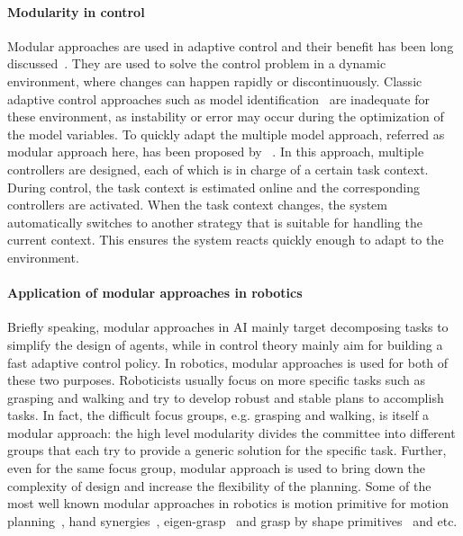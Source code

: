\paragraph{Modularity in control}
Modular approaches are used in adaptive control and their benefit has been long discussed~\citep{jacobs1991adaptive,narendra1997adaptive}. They are used to solve the control problem in a dynamic environment, where changes can happen rapidly or discontinuously.
Classic adaptive control approaches such as model identification~\citep{khalil2004modeling} are inadequate for these environment, as instability or error may occur during the optimization of the model variables. To quickly adapt the multiple model approach, referred as modular approach here, has been proposed by ~\citet{narendra1995adaptation}. In this approach, multiple controllers are designed, each of which is in charge of a certain task context. During control, the task context is estimated online and the corresponding controllers are activated. When the task context changes, the system automatically switches to another strategy that is suitable for handling the current context. This ensures the system reacts quickly enough to adapt to the environment.

\paragraph{Application of modular approaches in robotics}
Briefly speaking, modular approaches in AI mainly target decomposing tasks to simplify the design of agents, while in control theory mainly aim for building a fast adaptive control policy. In robotics, modular approaches is used for both of these two purposes. Roboticists usually focus on more specific tasks such as grasping and walking and try to develop robust and stable plans to accomplish tasks. In fact, the difficult focus groups, e.g. grasping and walking, is itself a modular approach: the high level modularity divides the committee into different groups that each try to provide a generic solution for the specific task. Further, even for the same focus group, modular approach is used to bring down the complexity of design and increase the flexibility of the planning. Some of the most well known modular approaches in robotics is motion primitive for motion planning~\citep{ijspeert2002movement,inamura2004embodied,kulic2008incremental,peters2008reinforcement}, hand synergies~\citep{santello2000force,gabiccini2011role,gioioso2013mapping}, eigen-grasp~\citep{Ciocarlie2009} and grasp by shape primitives~\citep{miller2003automatic,huebner2008minimum} and etc.



